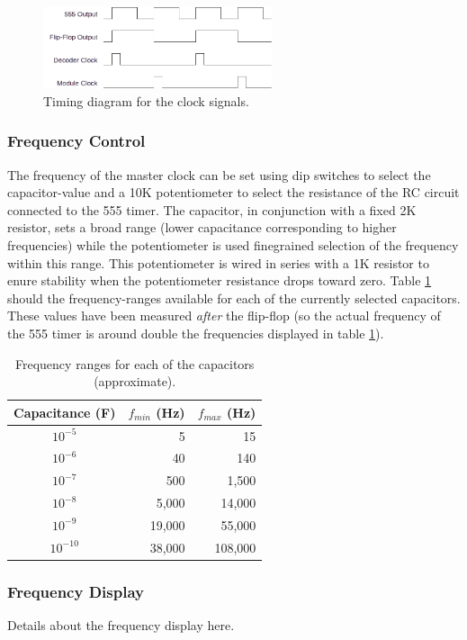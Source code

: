 \begin{figure}[H]
  \centering
  \includegraphics[width=0.6\textwidth]{img/clocktiming}
  \caption{Timing diagram for the clock signals.}
  \label{fig:clocktiming}
\end{figure}

\subsubsection{Frequency Control}
The frequency of the master clock can be set using dip switches to select the capacitor-value and a 10K potentiometer to select the resistance of the RC circuit connected to the 555 timer. The capacitor, in conjunction with a fixed 2K resistor, sets a broad range (lower capacitance corresponding to higher frequencies) while the potentiometer is used finegrained selection of the frequency within this range. This potentiometer is wired in series with a 1K resistor to enure stability when the potentiometer resistance drops toward zero. Table \ref{tab:frequencycontrol} should the frequency-ranges available for each of the currently selected capacitors. These values have been measured \emph{after} the flip-flop (so the actual frequency of the 555 timer is around double the frequencies displayed in table \ref{tab:frequencycontrol}).

\begin{table}
  \centering
  \begin{tabular}{c|r|r}
    Capacitance (F) & $f_{min}$ (Hz) & $f_{max}$ (Hz) \\ \hline
    $10^{-5}$  & 5 & 15 \\
    $10^{-6}$  & 40 & 140 \\
    $10^{-7}$  & 500 & 1,500 \\
    $10^{-8}$  & 5,000 & 14,000 \\
    $10^{-9}$  & 19,000 & 55,000 \\
    $10^{-10}$ & 38,000 & 108,000  
  \end{tabular}
  \caption{Frequency ranges for each of the capacitors (approximate).}
  \label{tab:frequencycontrol}
\end{table}

\subsubsection{Frequency Display}
Details about the frequency display here.


